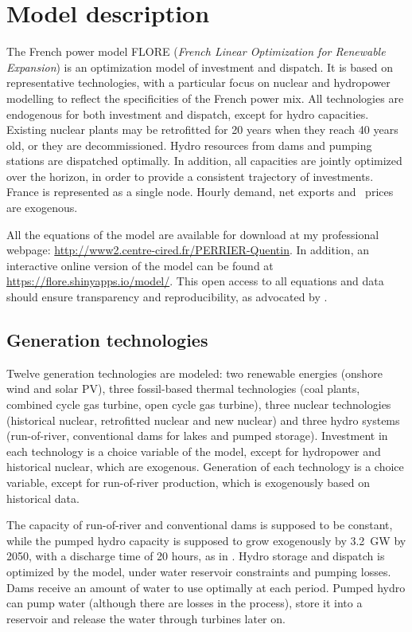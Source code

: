 \section{Model description} \label{sec:modelDescription}

The French power model FLORE (\textit{French Linear Optimization for Renewable Expansion}) is an optimization model of investment and dispatch. It is based on representative technologies, with a particular focus on nuclear and hydropower modelling to reflect the specificities of the French power mix. All technologies are endogenous for both investment and dispatch, except for hydro capacities. Existing nuclear plants may be retrofitted for 20 years when they reach 40 years old, or they are decommissioned. Hydro resources from dams and pumping stations are dispatched optimally. In addition, all capacities are jointly optimized over the horizon, in order to provide a consistent trajectory of investments. France is represented as a single node. Hourly demand, net exports and \coo\ prices are exogenous. 

All the equations of the model are available for download at my professional webpage: \url{http://www2.centre-cired.fr/PERRIER-Quentin}. 
In addition, an interactive online version of the model can be found at \url{https://flore.shinyapps.io/model/}. 
This open access to all equations and data should ensure transparency and reproducibility, as advocated by \citet{Pfenninger2017}.

\subsection{Generation technologies}

Twelve generation technologies are modeled: two renewable energies (onshore wind and solar PV), three fossil-based thermal technologies (coal plants, combined cycle gas turbine, open cycle gas turbine), three nuclear technologies (historical nuclear, retrofitted nuclear and new nuclear) and three hydro systems (run-of-river, conventional dams for lakes and pumped storage).
Investment in each technology is a choice variable of the model, except for hydropower and historical nuclear, which are exogenous.
Generation of each technology is a choice variable, except for run-of-river production, which is exogenously based on historical data.

The capacity of run-of-river and conventional dams is supposed to be constant, while the pumped hydro capacity is supposed to grow exogenously by 3.2~GW by 2050, with a discharge time of 20 hours, as in \citet{ADEME2013}.
Hydro storage and dispatch is optimized by the model, under water reservoir constraints and pumping losses.
Dams receive an amount of water to use optimally at each period.
Pumped hydro can pump water (although there are losses in the process), store it into a reservoir and release the water through turbines later on.

